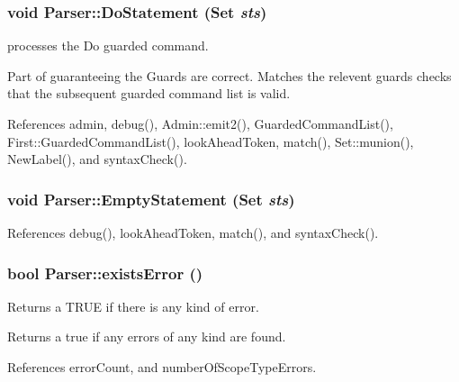 \hypertarget{classParser_ae1ced275b4dafa58b751c66333a41f98}{
\subsubsection[{DoStatement}]{\setlength{\rightskip}{0pt plus 5cm}void Parser::DoStatement ({\bf Set} {\em sts})}}
\label{classParser_ae1ced275b4dafa58b751c66333a41f98}


processes the Do guarded command. 

Part of guaranteeing the Guards are correct. Matches the relevent guards checks that the subsequent guarded command list is valid. 

References admin, debug(), Admin::emit2(), GuardedCommandList(), First::GuardedCommandList(), lookAheadToken, match(), Set::munion(), NewLabel(), and syntaxCheck().

\hypertarget{classParser_aa5c2ec1d4c045a6783887bd7453e99ed}{
\subsubsection[{EmptyStatement}]{\setlength{\rightskip}{0pt plus 5cm}void Parser::EmptyStatement ({\bf Set} {\em sts})}}
\label{classParser_aa5c2ec1d4c045a6783887bd7453e99ed}


References debug(), lookAheadToken, match(), and syntaxCheck().

\hypertarget{classParser_a7f02236268961b80c3d76902969a728a}{
\subsubsection[{existsError}]{\setlength{\rightskip}{0pt plus 5cm}bool Parser::existsError ()}}
\label{classParser_a7f02236268961b80c3d76902969a728a}


Returns a TRUE if there is any kind of error. 

Returns a true if any errors of any kind are found.

References errorCount, and numberOfScopeTypeErrors.

